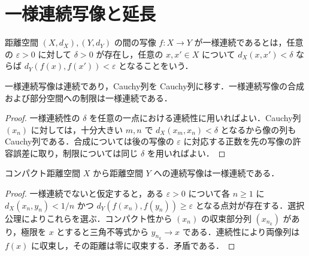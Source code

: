 \section{一様連続写像と延長}
\begin{defn}[距離空間の一様連続写像]
距離空間 $(X,d_X),(Y,d_Y)$ の間の写像 $f:X\to Y$ が一様連続であるとは，任意の $\varepsilon>0$ に対して $\delta>0$ が存在し，任意の $x,x'\in X$ について $d_X(x,x')<\delta$ ならば $d_Y(f(x),f(x'))<\varepsilon$ となることをいう．
\end{defn}
\begin{prop}[一様連続性の基本性質]
一様連続写像は連続であり，Cauchy列を Cauchy列に移す．一様連続写像の合成および部分空間への制限は一様連続である．
\end{prop}
\begin{proof}
一様連続性の $\delta$ を任意の一点における連続性に用いればよい．Cauchy列 $(x_n)$ に対しては，十分大きい $m,n$ で $d_X(x_m,x_n)<\delta$ となるから像の列も Cauchy列である．合成については後の写像の $\varepsilon$ に対応する正数を先の写像の許容誤差に取り，制限については同じ $\delta$ を用いればよい．
\end{proof}
\begin{prop}
コンパクト距離空間 $X$ から距離空間 $Y$ への連続写像は一様連続である．
\end{prop}
\begin{proof}
一様連続でないと仮定すると，ある $\varepsilon>0$ について各 $n\geq1$ に $d_X(x_n,y_n)<1/n$ かつ $d_Y(f(x_n),f(y_n))\geq\varepsilon$ となる点対が存在する．選択公理によりこれらを選ぶ．コンパクト性から $(x_n)$ の収束部分列 $(x_{n_k})$ があり，極限を $x$ とすると三角不等式から $y_{n_k}\to x$ である．連続性により両像列は $f(x)$ に収束し，その距離は零に収束する．矛盾である．
\end{proof}
